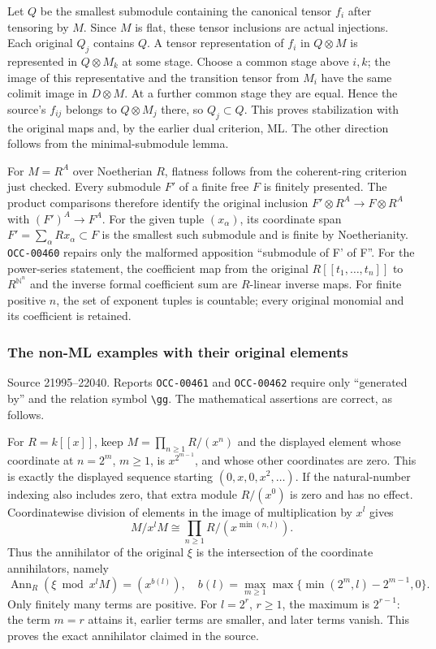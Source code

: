 Let \(Q\) be the smallest submodule containing the canonical tensor \(f_i\) after tensoring by \(M\). Since \(M\) is flat, these tensor inclusions are actual injections. Each original \(Q_j\) contains \(Q\). A tensor representation of \(f_i\) in \(Q\otimes M\) is represented in \(Q\otimes M_k\) at some stage. Choose a common stage above \(i,k\); the image of this representative and the transition tensor from \(M_i\) have the same colimit image in \(D\otimes M\). At a further common stage they are equal. Hence the source's \(f_{ij}\) belongs to \(Q\otimes M_j\) there, so \(Q_j\subset Q\). This proves stabilization with the original maps and, by the earlier dual criterion, ML. The other direction follows from the minimal-submodule lemma.

For \(M=R^A\) over Noetherian \(R\), flatness follows from the coherent-ring criterion just checked. Every submodule \(F'\) of a finite free \(F\) is finitely presented. The product comparisons therefore identify the original inclusion \(F'\otimes R^A\to F\otimes R^A\) with \((F')^A\to F^A\). For the given tuple \((x_\alpha)\), its coordinate span \(F'=\sum_\alpha Rx_\alpha\subset F\) is the smallest such submodule and is finite by Noetherianity. \texttt{OCC-00460} repairs only the malformed apposition ``submodule of F' of F''. For the power-series statement, the coefficient map from the original \(R[[t_1,\ldots,t_n]]\) to \(R^{\mathbb N^n}\) and the inverse formal coefficient sum are \(R\)-linear inverse maps. For finite positive \(n\), the set of exponent tuples is countable; every original monomial and its coefficient is retained.

\subsubsection{The non-ML examples with their original elements}\label{algebra-proof-013-the-non-ml-examples-with-their-original-elements}

Source 21995--22040. Reports \texttt{OCC-00461} and \texttt{OCC-00462} require only ``generated by'' and the relation symbol \texttt{\textbackslash{}gg}. The mathematical assertions are correct, as follows.

For \(R=k[[x]]\), keep \(M=\prod_{n\geq1}R/(x^n)\) and the displayed element whose coordinate at \(n=2^m\), \(m\geq1\), is \(x^{2^{m-1}}\), and whose other coordinates are zero. This is exactly the displayed sequence starting \((0,x,0,x^2,\ldots)\). If the natural-number indexing also includes zero, that extra module \(R/(x^0)\) is zero and has no effect. Coordinatewise division of elements in the image of multiplication by \(x^l\) gives \[
M/x^lM\cong\prod_{n\geq1}R/(x^{\min(n,l)}).
\] Thus the annihilator of the original \(\xi\) is the intersection of the coordinate annihilators, namely \[
\operatorname{Ann}_R(\xi\bmod x^lM)=(x^{b(l)}),
\quad b(l)=\max_{m\geq1}\max\{\min(2^m,l)-2^{m-1},0\}.
\] Only finitely many terms are positive. For \(l=2^r\), \(r\geq1\), the maximum is \(2^{r-1}\): the term \(m=r\) attains it, earlier terms are smaller, and later terms vanish. This proves the exact annihilator claimed in the source.

